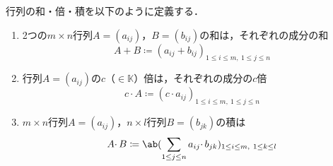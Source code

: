 \documentclass[../sotsu.tex]{subfiles}
\begin{document}
\begin{definition}
    行列の和・倍・積を以下のように定義する．
    \begin{enumerate}
        \item 2つの$m \times n$行列$A = (a_{ij})$，$B = (b_{ij})$の和は，それぞれの成分の和
            \begin{equation}
                A + B \coloneq (a_{ij} + b_{ij})_{1 \leq i \leq m, \  1 \leq j \leq n}
            \end{equation}
        \item 行列$A = (a_{ij})$の$c$（$\in 𝕂$）倍は，それぞれの成分の$c$倍
            \begin{equation}
                c \cdotp A \coloneq (c \cdotp a_{ij})_{1 \leq i \leq m, \  1 \leq j \leq n}
            \end{equation}
        \item $m \times n$行列$A = (a_{ij})$，$n \times l$行列$B = (b_{jk})$の積は
            \begin{equation}
                A \cdotp B \coloneq \ab( \sum_{1 \leq j \leq n} a_{ij} \cdotp b_{jk} )_{1 \leq i \leq m, \  1 \leq k \leq l}
            \end{equation}
    \end{enumerate}
\end{definition}
\end{document}

